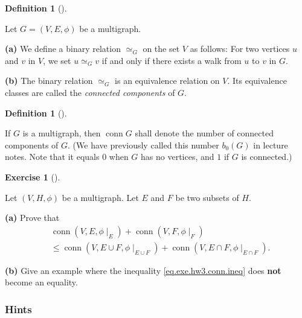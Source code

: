 \documentclass[numbers=enddot,12pt,final,onecolumn,notitlepage]{scrartcl}%
\newcounter{exer}
\theoremstyle{definition}
\newtheorem{defi}[theo]{Definition}
\newenvironment{definition}[1][]
{\begin{defi}[#1]\begin{leftbar}}
{\end{leftbar}\end{defi}}
\newtheorem{exmp}[exer]{Exercise}
\newenvironment{exercise}[1][]
{\begin{exmp}[#1]\begin{leftbar}}
{\end{leftbar}\end{exmp}}
\newcommand{\conn}{\operatorname{conn}}
\newcommand{\tup}[1]{\left( #1 \right)}
\begin{document}
\begin{definition}
Let $G = \tup{V, E, \phi}$ be a multigraph.

\textbf{(a)} We define a binary relation $\simeq_G$ on the set $V$
as follows:
For two vertices $u$ and $v$ in $V$, we set $u \simeq_G v$ if and
only if there exists a walk from $u$ to $v$ in $G$.

\textbf{(b)} The binary relation $\simeq_G$ is an equivalence
relation on $V$.
Its equivalence classes are called the \textit{connected components}
of $G$.
\end{definition}

\begin{definition} \label{def.hw3.conn}
If $G$ is a multigraph, then $\conn G$ shall denote the
number of connected components of $G$.
(We have previously called this number $b_0 \tup{G}$ in lecture notes.
Note that it equals $0$ when $G$
has no vertices, and $1$ if $G$ is connected.)
\end{definition}

\begin{exercise} \label{exe.hw3.conn}
Let $\tup{V, H, \phi}$ be a multigraph. Let $E$ and $F$ be two
subsets of $H$.

\textbf{(a)} Prove that
\begin{align}
& \conn \tup{V, E, \phi\mid_E}
+ \conn \tup{V, F, \phi\mid_F} \nonumber \\
& \leq
\conn \tup{V, E \cup F, \phi\mid_{E \cup F}}
+ \conn \tup{V, E \cap F, \phi\mid_{E \cap F}} .
\label{eq.exe.hw3.conn.ineq}
\end{align}

\textbf{(b)} Give an example where the inequality
\eqref{eq.exe.hw3.conn.ineq} does \textbf{not} become an equality.
\end{exercise}

\subsubsection{Hints}
\end{document}

